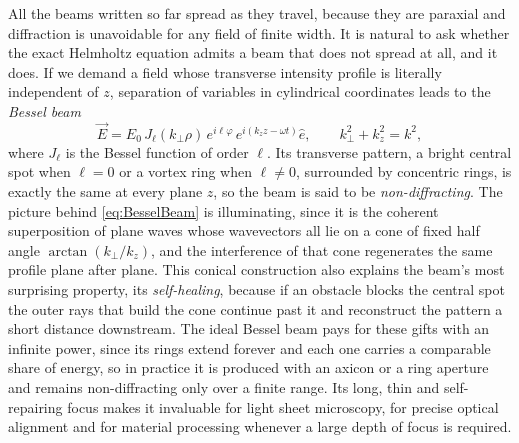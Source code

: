        All the beams written so far spread as they travel, because they are paraxial and diffraction is unavoidable for any field of finite width. It is natural to ask whether the exact Helmholtz equation admits a beam that does not spread at all, and it does. If we demand a field whose transverse intensity profile is literally independent of $z$, separation of variables in cylindrical coordinates leads to the \textit{Bessel beam}
       \begin{equation}\label{eq:BesselBeam}
            \vec{E} = E_0\, J_\ell(k_\perp\rho)\,e^{i\ell\varphi}\,e^{i(k_z z - \omega t)}\hat{e}, \qquad k_\perp^2 + k_z^2 = k^2,
       \end{equation}
       where $J_\ell$ is the Bessel function of order $\ell$. Its transverse pattern, a bright central spot when $\ell=0$ or a vortex ring when $\ell\neq 0$, surrounded by concentric rings, is exactly the same at every plane $z$, so the beam is said to be \textit{non-diffracting}. The picture behind \ref{eq:BesselBeam} is illuminating, since it is the coherent superposition of plane waves whose wavevectors all lie on a cone of fixed half angle $\arctan(k_\perp/k_z)$, and the interference of that cone regenerates the same profile plane after plane. This conical construction also explains the beam's most surprising property, its \textit{self-healing}, because if an obstacle blocks the central spot the outer rays that build the cone continue past it and reconstruct the pattern a short distance downstream. The ideal Bessel beam pays for these gifts with an infinite power, since its rings extend forever and each one carries a comparable share of energy, so in practice it is produced with an axicon or a ring aperture and remains non-diffracting only over a finite range. Its long, thin and self-repairing focus makes it invaluable for light sheet microscopy, for precise optical alignment and for material processing whenever a large depth of focus is required.

